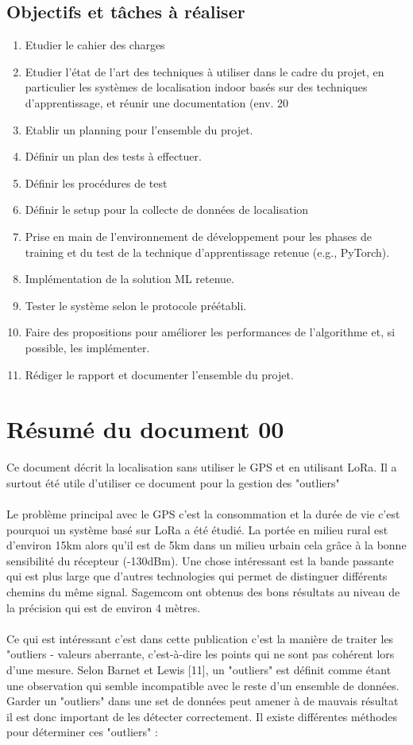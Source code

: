 \subsection{Objectifs et tâches à réaliser}
\begin{enumerate}
	\item Etudier le cahier des charges
	\item Etudier l’état de l’art des techniques à utiliser dans le cadre du projet, en particulier les systèmes de localisation indoor basés sur des techniques d’apprentissage, et réunir une documentation (env. 20%
	\item Etablir un planning pour l’ensemble du projet.
	\item Définir un plan des tests à effectuer.
	\item Définir les procédures de test
	\item Définir le setup pour la collecte de données de localisation
	\item Prise en main de l’environnement de développement pour les phases de training et du test de la technique d’apprentissage retenue (e.g., PyTorch).
	\item Implémentation de la solution ML retenue.
	\item Tester le système selon le protocole préétabli.
	\item Faire des propositions pour améliorer les performances de l’algorithme et, si possible, les implémenter.
	\item Rédiger le rapport et documenter l’ensemble du projet.
\end{enumerate}


\section{Résumé du document 00}
Ce document décrit la localisation sans utiliser le GPS et en utilisant LoRa. Il a surtout été utile d'utiliser ce document pour la gestion des "outliers"
\\
\\
Le problème principal avec le GPS c'est la consommation et la durée de vie c'est pourquoi un système basé sur LoRa a été étudié. La portée en milieu rural est d'environ 15km alors qu'il est de 5km dans un milieu urbain cela grâce à la bonne sensibilité du récepteur (-130dBm). Une chose intéressant est la bande passante qui est plus large que d'autres technologies qui permet de distinguer différents chemins du même signal. Sagemcom ont obtenus des bons résultats au niveau de la précision qui est de environ 4 mètres. 
\\
\\
Ce qui est intéressant c'est dans cette publication c'est la manière de traiter les "outliers - valeurs aberrante, c'est-à-dire les points qui ne sont pas cohérent lors d'une mesure. Selon Barnet et Lewis [11], un "outliers" est définit comme étant une observation qui semble incompatible avec le reste d'un ensemble de données.
Garder un "outliers" dans une set de données peut amener à de mauvais résultat il est donc important de les détecter correctement. Il existe différentes méthodes pour déterminer ces "outliers" :

